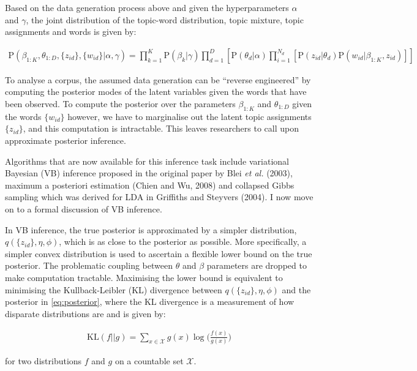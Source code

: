 \documentclass[11pt,preprint, authoryear]{article}
\begin{document}
\normalsize

Based on the data generation process above and given the hyperparameters
\(\alpha\) and \(\gamma\), the joint distribution of the topic-word
distribution, topic mixture, topic assignments and words is given by:

\begin{align} \label{eq:posterior}
\text{P}(\beta_{1:K}, \theta_{1:D}, \{z_{id}\}, \{w_{id}\} | \alpha, \gamma) = \prod_{k=1}^K \text{P}(\beta_k | \gamma) \prod_{d=1}^D \left[ \text{P}(\theta_d | \alpha) \prod_{i=1}^{N_d} [\text{P}(z_{id} | \theta_d) \text{P}(w_{id} | \beta_{1:K}, z_{id}) ] \right]
\end{align}

To analyse a corpus, the assumed data generation can be ``reverse
engineered'' by computing the posterior modes of the latent variables
given the words that have been observed. To compute the posterior over
the parameters \(\beta_{1:K}\) and \(\theta_{1:D}\) given the words
\(\{w_{id}\}\) however, we have to marginalise out the latent topic
assignments \(\{z_{id}\}\), and this computation is intractable. This
leaves researchers to call upon approximate posterior inference.

Algorithms that are now available for this inference task include
variational Bayesian (VB) inference proposed in the original paper by
Blei \emph{et al.} (2003), maximum a posteriori estimation (Chien and
Wu, 2008) and collapsed Gibbs sampling which was derived for LDA in
Griffiths and Steyvers (2004). I now move on to a formal discussion of
VB inference.

In VB inference, the true posterior is approximated by a simpler
distribution, \(q(\{z_{id}\}, \eta, \phi)\), which is as close to the
posterior as possible. More specifically, a simpler convex distribution
is used to ascertain a flexible lower bound on the true posterior. The
problematic coupling between \(\theta\) and \(\beta\) parameters are
dropped to make computation tractable. Maximising the lower bound is
equivalent to minimising the Kullback-Leibler (KL) divergence between
\(q(\{z_{id}\}, \eta, \phi)\) and the posterior in \ref{eq:posterior},
where the KL divergence is a measurement of how disparate distributions
are and is given by:

\begin{align} \label{eq:kl}
\text{KL}(f||g) = \sum_{x \in \mathcal{X}} g(x) \log \Big( \frac{f(x)}{g(x)} \Big)
\end{align}

for two distributions \(f\) and \(g\) on a countable set
\(\mathcal{X}\).
\end{document}
